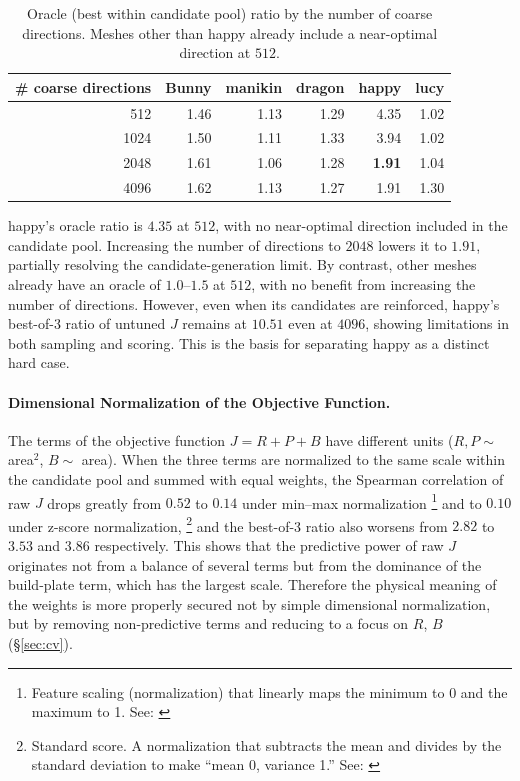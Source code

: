 \documentclass[11pt,a4paper]{article}
\begin{document}
\begin{table}[H]
\centering
\caption{Oracle (best within candidate pool) ratio by the number of coarse directions. Meshes other than happy
already include a near-optimal direction at $512$.}
\label{tab:sampling}
\begin{tabular}{rrrrrr}
\toprule
\# coarse directions & Bunny & manikin & dragon & happy & lucy\\
\midrule
512  & 1.46 & 1.13 & 1.29 & 4.35 & 1.02\\
1024 & 1.50 & 1.11 & 1.33 & 3.94 & 1.02\\
2048 & 1.61 & 1.06 & 1.28 & \textbf{1.91} & 1.04\\
4096 & 1.62 & 1.13 & 1.27 & 1.91 & 1.30\\
\bottomrule
\end{tabular}
\end{table}

happy's oracle ratio is $4.35$ at $512$, with no near-optimal direction included in the candidate pool.
Increasing the number of directions to $2048$ lowers it to $1.91$, partially resolving the candidate-generation limit.
By contrast, other meshes already have an oracle of $1.0$--$1.5$ at $512$, with no benefit from increasing the number of directions.
However, even when its candidates are reinforced, happy's best-of-3 ratio of untuned $J$ remains at $10.51$ even at $4096$,
showing limitations in both sampling and scoring. This is the basis for separating happy as a distinct hard case.

\paragraph{Dimensional Normalization of the Objective Function.}
The terms of the objective function $J=R+P+B$ have different units ($R,P\sim$ area$^2$, $B\sim$ area).
When the three terms are normalized to the same scale within the candidate pool and summed with equal weights,
the Spearman correlation of raw $J$ drops greatly from $0.52$ to $0.14$ under min--max normalization%
\footnote{Feature scaling (normalization) that linearly maps the minimum to 0 and the maximum to 1. See: \cite{hanmining}}
and to $0.10$ under z-score normalization,%
\footnote{Standard score. A normalization that subtracts the mean and divides by the standard deviation to make ``mean 0, variance 1.''
See: \cite{hanmining}}
and the best-of-3 ratio also worsens from $2.82$ to $3.53$ and $3.86$ respectively.
This shows that the predictive power of raw $J$ originates not from a balance of several terms but from the dominance of the build-plate term, which has the largest scale.
Therefore the physical meaning of the weights is more properly secured not by simple dimensional normalization,
but by removing non-predictive terms and reducing to a focus on $R$, $B$ (\S\ref{sec:cv}).
\end{document}
